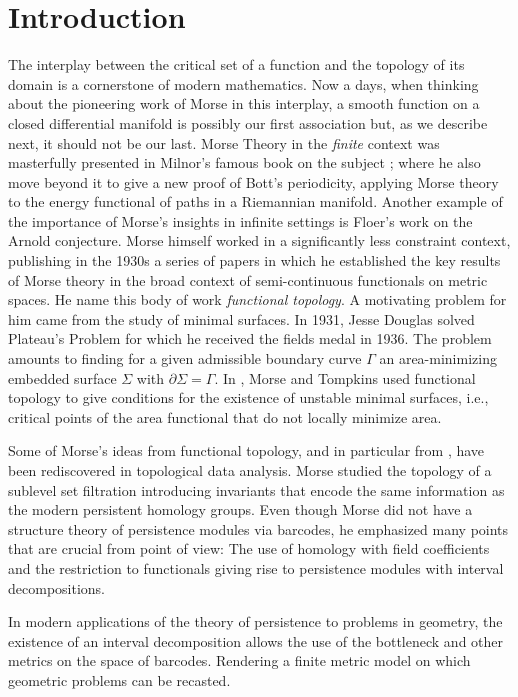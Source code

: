 
\section{Introduction}

The interplay between the critical set of a function and the topology of its domain is a cornerstone of modern mathematics.
Now a days, when thinking about the pioneering work of Morse in this interplay, a smooth function on a closed differential manifold is possibly our first association but, as we describe next, it should not be our last.
Morse Theory in the \textit{finite} context was masterfully presented in Milnor's famous book on the subject \cite{MR0163331}; where he also move beyond it to give a new proof of Bott's periodicity, applying Morse theory to the energy functional of paths in a Riemannian manifold.
Another example of the importance of Morse's insights in infinite settings is Floer's work on the Arnold conjecture.
Morse himself worked in a significantly less constraint context, publishing in the 1930s a series of papers \cite{Morse.1937, Morse.1938, Morse.1940, MR9102} in which he established the key results of Morse theory in the broad context of semi-continuous functionals on metric spaces.
He name this body of work \textit{functional topology}.
A motivating problem for him came from the study of minimal surfaces.
In 1931, Jesse Douglas solved Plateau’s Problem \cite{Douglas.1931} for which he received the fields medal in 1936.
The problem amounts to finding for a given admissible boundary curve $\Gamma$ an area-minimizing embedded surface $\Sigma$ with $\partial \Sigma = \Gamma$.
In \cite{Morse.1939, Morse.1941}, Morse and Tompkins used functional topology to give conditions for the existence of unstable minimal surfaces, i.e., critical points of the area functional that do not locally minimize area.

Some of Morse's ideas from functional topology, and in particular from \cite{Morse.1940}, have been rediscovered in topological data analysis.
Morse studied the topology of a sublevel set filtration introducing invariants that encode the same information as the modern persistent homology groups.
Even though Morse did not have a structure theory of persistence modules via barcodes, he emphasized many points that are crucial from point of view:
The use of homology with field coefficients and the restriction to functionals giving rise to persistence modules with interval decompositions.

In modern applications of the theory of persistence to problems in geometry, the existence of an interval decomposition allows the use of the bottleneck and other metrics on the space of barcodes.
Rendering a finite metric model on which geometric problems can be recasted.

